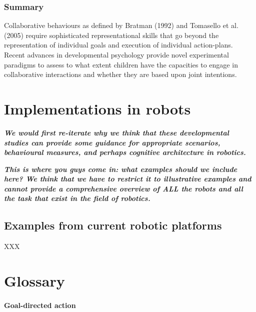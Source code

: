 \documentclass{article}
\begin{document}
\subsubsection{Summary}

Collaborative behaviours as defined by Bratman (1992) and Tomasello et al.
(2005) require sophisticated representational skills that go beyond the
representation of individual goals and execution of individual action-plans.
Recent advances in developmental psychology provide novel experimental
paradigms to assess to what extent children have the capacities to engage in
collaborative interactions and whether they are based upon joint intentions. 

\section{Implementations in robots}

{\bfseries\itshape We would first re-iterate why we think that these
developmental studies can provide some guidance for appropriate scenarios,
behavioural measures, and perhaps cognitive architecture in robotics.}

{\bfseries\itshape This is where you guys come in: what examples should we
include here? We think that we have to restrict it to illustrative examples and
cannot provide a comprehensive overview of ALL the robots and all the task that
exist in the field of robotics.}

\subsection{Examples from current robotic platforms}

XXX

\section{Glossary}

\paragraph{Goal-directed action}
\end{document}
